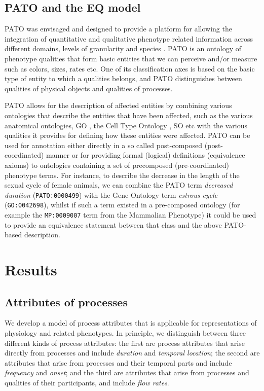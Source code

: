 \documentclass[12pt]{article}
\renewcommand{\cite}{\citep}
\begin{document}
\subsection{PATO and the EQ model}
PATO was envisaged and designed to provide a platform for allowing the
integration of quantitative and qualitative phenotype related
information across different domains, levels of granularity and
species \cite{Gkoutos2005}.  PATO is an ontology of phenotype
qualities that form basic entities that we can perceive and/or measure
such as colors, sizes, rates etc. One of its classification axes is
based on the basic type of entity to which a qualities belongs, and
PATO distinguishes between qualities of physical objects and qualities
of processes.

PATO allows for the description of affected entities by combining
various ontologies that describe the entities that have been affected,
such as the various anatomical ontologies, GO \cite {Ashburner2000b},
the Cell Type Ontology \cite {Bard2005}, SO \cite {Eilbeck2005} etc
with the various qualities it provides for defining how these entities
were affected.  PATO can be used for annotation either directly in a
so called post-composed (post-coordinated) manner or for providing
formal (logical) definitions (equivalence axioms) to ontologies
containing a set of precomposed (pre-coordinated) phenotype terms. For
instance, to describe the decrease in the length of the sexual cycle
of female animals, we can combine the PATO term \textit{decreased
  duration} ({\tt PATO:0000499}) with the Gene Ontology term
\textit{estrous cycle} ({\tt GO:0042698}), whilst if such a term
existed in a pre-composed ontology (for example the {\tt MP:0009007}
term from the Mammalian Phenotype) it could be used to provide an
equivalence statement between that class and the above PATO-based
description.

\section{Results}
\subsection{Attributes of processes}
We develop a model of process attributes that is applicable for
representations of physiology and related phenotypes. In principle, we
distinguish between three different kinds of process attributes: the
first are process attributes that arise directly from processes and
include {\em duration} and {\em temporal location}; the second are
attributes that arise from processes and their temporal parts and
include {\em frequency} and {\em onset}; and the third are attributes
that arise from processes and qualities of their participants, and
include {\em flow rates}.
\end{document}
